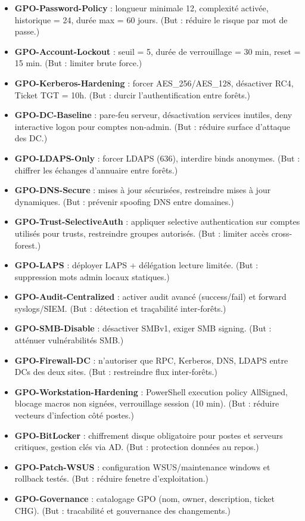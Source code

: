 \begin{itemize}
	\item \textbf{GPO-Password-Policy} : longueur minimale 12, complexité activée, historique = 24, durée max = 60 jours. (But : réduire le risque par mot de passe.)
	\item \textbf{GPO-Account-Lockout} : seuil = 5, durée de verrouillage = 30 min, reset = 15 min. (But : limiter brute force.)
	\item \textbf{GPO-Kerberos-Hardening} : forcer AES\_256/AES\_128, désactiver RC4, Ticket TGT = 10h. (But : durcir l'authentification entre forêts.)
	\item \textbf{GPO-DC-Baseline} : pare‑feu serveur, désactivation services inutiles, deny interactive logon pour comptes non‑admin. (But : réduire surface d'attaque des DC.)
	\item \textbf{GPO-LDAPS-Only} : forcer LDAPS (636), interdire binds anonymes. (But : chiffrer les échanges d'annuaire entre forêts.)
	\item \textbf{GPO-DNS-Secure} : mises à jour sécurisées, restreindre mises à jour dynamiques. (But : prévenir spoofing DNS entre domaines.)
	\item \textbf{GPO-Trust-SelectiveAuth} : appliquer selective authentication sur comptes utilisés pour trusts, restreindre groupes autorisés. (But : limiter accès cross-forest.)
	\item \textbf{GPO-LAPS} : déployer LAPS + délégation lecture limitée. (But : suppression mots admin locaux statiques.)
	\item \textbf{GPO-Audit-Centralized} : activer audit avancé (success/fail) et forward syslogs/SIEM. (But : détection et traçabilité inter‑forêts.)
	\item \textbf{GPO-SMB-Disable} : désactiver SMBv1, exiger SMB signing. (But : atténuer vulnérabilités SMB.)
	\item \textbf{GPO-Firewall-DC} : n'autoriser que RPC, Kerberos, DNS, LDAPS entre DCs des deux sites. (But : restreindre flux inter‑forêts.)
	\item \textbf{GPO-Workstation-Hardening} : PowerShell execution policy AllSigned, blocage macros non signées, verrouillage session (10 min). (But : réduire vecteurs d'infection côté postes.)
	\item \textbf{GPO-BitLocker} : chiffrement disque obligatoire pour postes et serveurs critiques, gestion clés via AD. (But : protection données au repos.)
	\item \textbf{GPO-Patch-WSUS} : configuration WSUS/maintenance windows et rollback testés. (But : réduire fenetre d'exploitation.)
	\item \textbf{GPO-Governance} : catalogage GPO (nom, owner, description, ticket CHG). (But : tracabilité et gouvernance des changements.)
\end{itemize}

